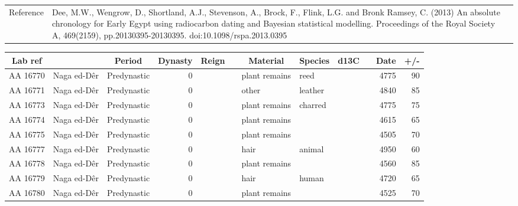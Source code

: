\documentclass[a4paper,8pt]{article}
\begin{document}
\pagestyle{myheadings}\begin{longtable}{|>{\raggedright}p{}|>{\raggedright}p{}l|}
\hline
\hline\endhead\hline\endfoot\hline\hline\endlastfoot
Reference & Dee, M.W., Wengrow, D., Shortland, A.J., Stevenson, A., Brock, F., Flink, L.G. and Bronk Ramsey, C. (2013) An absolute chronology for Early Egypt using radiocarbon dating and Bayesian statistical modelling. Proceedings of the Royal Society A, 469(2159), pp.20130395-20130395. doi:10.1098/\-rspa.2013.0395 & \\
\end{longtable}
\eject
\begin{landscape}
\small\sf\begin{center}
\begin{longtable}{|l|>{\raggedright}p{20ex}|l|r|l|>{\raggedright}p{25ex}|l|l|r|l|r|r|}
\hline
\multicolumn{1}{|c|}{Lab ref} & \multicolumn{1}{c|}{\parbox[t]{20ex}{\centering Site\vspace{2pt}}} & \multicolumn{1}{c|}{Period} & \multicolumn{1}{c|}{Dynasty} & \multicolumn{1}{c|}{Reign} & \multicolumn{1}{c|}{\parbox[t]{25ex}{\centering Sample\vspace{2pt}}} & \multicolumn{1}{c|}{Material} & \multicolumn{1}{c|}{Species} & \multicolumn{1}{c|}{d13C} & \multicolumn{1}{c|}{} & \multicolumn{1}{c|}{Date} & \multicolumn{1}{c|}{+/\--}\\
\hline\endhead\hline\endfoot\hline\hline\endlastfoot
AA 16770 & Naga ed-Dêr & Predynastic & 0 &  &  & plant remains & reed &   &  & 4775 & 90\\
AA 16771 & Naga ed-Dêr & Predynastic & 0 &  &  & other & leather &   &  & 4840 & 85\\
AA 16773 & Naga ed-Dêr & Predynastic & 0 &  &  & plant remains & charred &   &  & 4775 & 75\\
AA 16774 & Naga ed-Dêr & Predynastic & 0 &  &  & plant remains &  &   &  & 4615 & 65\\
AA 16775 & Naga ed-Dêr & Predynastic & 0 &  &  & plant remains &  &   &  & 4505 & 70\\
AA 16777 & Naga ed-Dêr & Predynastic & 0 &  &  & hair & animal &   &  & 4950 & 60\\
AA 16778 & Naga ed-Dêr & Predynastic & 0 &  &  & plant remains &  &   &  & 4560 & 85\\
AA 16779 & Naga ed-Dêr & Predynastic & 0 &  &  & hair & human &   &  & 4720 & 65\\
AA 16780 & Naga ed-Dêr & Predynastic & 0 &  &  & plant remains &  &   &  & 4525 & 70\\

\end{longtable}
\end{center}
\end{landscape}
\end{document}
